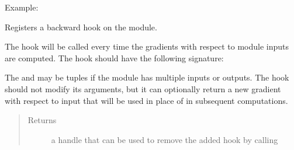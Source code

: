 \documentclass[letterpaper,10pt,english]{sphinxmanual}
\begin{document}
\begin{fulllineitems}
\begin{fulllineitems}
\begin{quote}
\begin{description}
\end{description}\end{quote}

Example:

\begin{sphinxVerbatim}[commandchars=\\\{\}]
   
     
\end{sphinxVerbatim}

\end{fulllineitems}


\begin{fulllineitems}
\label{\detokenize{api/dynamics:geology.metamodelling.dynamics.LatentSpaceDynamics.register_backward_hook}}
Registers a backward hook on the module.

The hook will be called every time the gradients with respect to module
inputs are computed. The hook should have the following signature:

\begin{sphinxVerbatim}[commandchars=\\\{\}]
      
\end{sphinxVerbatim}

The  and  may be tuples if the
module has multiple inputs or outputs. The hook should not modify its
arguments, but it can optionally return a new gradient with respect to
input that will be used in place of  in subsequent
computations.
\begin{quote}\begin{description}
\item[{Returns}] \leavevmode
a handle that can be used to remove the added hook by calling


\end{description}
\end{quote}
\end{fulllineitems}
\end{fulllineitems}
\end{document}
